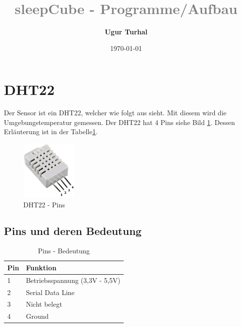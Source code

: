 \documentclass[12pt]{article}
\title{\textcolor{gray}{\textbf{sleepCube - Programme/Aufbau}\\[0.2cm]}}
\author[1]{\fontsize{9}{9} \textbf{Ugur Turhal}}
\affil[1]{\fontsize{8}{8}\href{mailto:ugur.turhal@me.com}{ugur.turhal@me.com}}
\date{\today}
\begin{document}
\maketitle
\tableofcontents
{}
\newpage
\setcounter{page}{1}
\section{DHT22}
\justifying
Der Sensor ist ein DHT22, welcher wie folgt aus sieht. Mit diesem wird die Umgebungstemperatur gemessen. Der DHT22 hat 4 Pins siehe Bild \ref{Fig:description}. Dessen Erläuterung ist in der Tabelle\ref{Tabular:pins}.
\begin{figure}[H]
\begin{center}
\includegraphics[width = 0.25\textwidth]{pics/DHT22.jpg}
\caption{DHT22 - Pins}
\label{Fig:description}
\end{center}
\end{figure}
\subsection{Pins und deren Bedeutung}
\begin{table}[H]
\centering
{}
\begin{tabular}{l|l}
\textbf{Pin} & \textbf{Funktion}\\ \hline \hline
1 & Betriebsspannung (3,3V - 5,5V) \\ \hline
2 & Serial Data Line\\\hline
3 & Nicht belegt\\ \hline
4 & Ground
\end{tabular}
\caption{Pins - Bedeutung}
\label{Tabular:pins}
\end{table}
\end{document}
